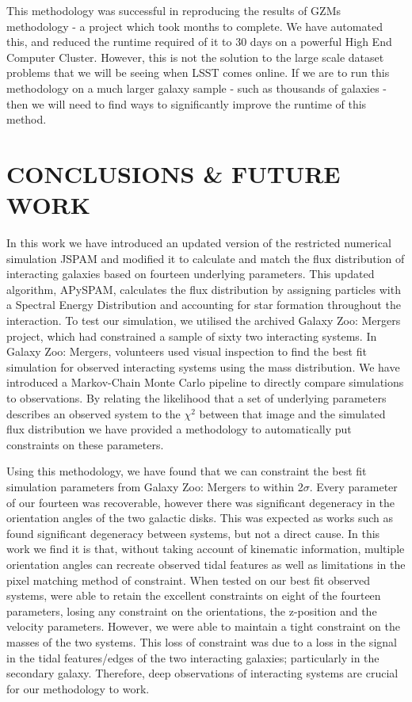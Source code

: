 This methodology was successful in reproducing the results of GZMs methodology - a project which took months to complete. We have automated this, and reduced the runtime required of it to 30 days on a powerful High End Computer Cluster. However, this is not the solution to the large scale dataset problems that we will be seeing when LSST comes online. If we are to run this methodology on a much larger galaxy sample - such as thousands of galaxies - then we will need to find ways to significantly improve the runtime of this method.

\section{CONCLUSIONS \& FUTURE WORK}\label{Conclusions}
\noindent In this work we have introduced an updated version of the restricted numerical simulation JSPAM and modified it to calculate and match the flux distribution of interacting galaxies based on fourteen underlying parameters. This updated algorithm, APySPAM, calculates the flux distribution by assigning particles with a Spectral Energy Distribution and accounting for star formation throughout the interaction. To test our simulation, we utilised the archived Galaxy Zoo: Mergers project, which had constrained a sample of sixty two interacting systems. In Galaxy Zoo: Mergers, volunteers used visual inspection to find the best fit simulation for observed interacting systems using the mass distribution. We have introduced a Markov-Chain Monte Carlo pipeline to directly compare simulations to observations. By relating the likelihood that a set of underlying parameters describes an observed system to the $\chi^{2}$ between that image and the simulated flux distribution we have provided a methodology to automatically put constraints on these parameters.

Using this methodology, we have found that we can constraint the best fit simulation parameters from Galaxy Zoo: Mergers to within 2$\sigma$. Every parameter of our fourteen was recoverable, however there was significant degeneracy in the orientation angles of the two galactic disks. This was expected as works such as \citet{2010ASPC..423..227S} found significant degeneracy between systems, but not a direct cause. In this work we find it is that, without taking account of kinematic information, multiple orientation angles can recreate observed tidal features as well as limitations in the pixel matching method of constraint. When tested on our best fit observed systems, were able to retain the excellent constraints on eight of the fourteen parameters, losing any constraint on the orientations, the z-position and the velocity parameters. However, we were able to maintain a tight constraint on the masses of the two systems. This loss of constraint was due to a loss in the signal in the tidal features/edges of the two interacting galaxies; particularly in the secondary galaxy. Therefore, deep observations of interacting systems are crucial for our methodology to work. 

